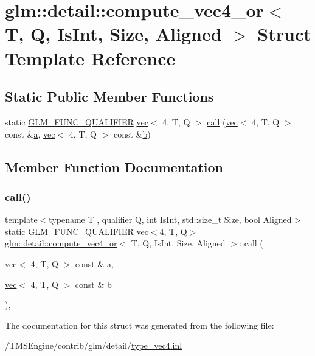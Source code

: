 \hypertarget{structglm_1_1detail_1_1compute__vec4__or}{}\section{glm\+:\+:detail\+:\+:compute\+\_\+vec4\+\_\+or$<$ T, Q, Is\+Int, Size, Aligned $>$ Struct Template Reference}
\label{structglm_1_1detail_1_1compute__vec4__or}
\subsection*{Static Public Member Functions}
\begin{DoxyCompactItemize}
\item 
static \hyperlink{setup_8hpp_a33fdea6f91c5f834105f7415e2a64407}{G\+L\+M\+\_\+\+F\+U\+N\+C\+\_\+\+Q\+U\+A\+L\+I\+F\+I\+ER} \hyperlink{structglm_1_1vec}{vec}$<$ 4, T, Q $>$ \hyperlink{structglm_1_1detail_1_1compute__vec4__or_a6d52ef76bd8362c6325edf1eb38a8d65}{call} (\hyperlink{structglm_1_1vec}{vec}$<$ 4, T, Q $>$ const \&\hyperlink{_s_d_l__opengl__glext_8h_a3309789fc188587d666cda5ece79cf82}{a}, \hyperlink{structglm_1_1vec}{vec}$<$ 4, T, Q $>$ const \&\hyperlink{_s_d_l__opengl__glext_8h_a0f71581a41fd2264c8944126dabbd010}{b})
\end{DoxyCompactItemize}


\subsection{Member Function Documentation}
\mbox{\label{structglm_1_1detail_1_1compute__vec4__or_a6d52ef76bd8362c6325edf1eb38a8d65}} 
\subsubsection{\texorpdfstring{call()}{call()}}
{\footnotesize\ttfamily template$<$typename T , qualifier Q, int Is\+Int, std\+::size\+\_\+t Size, bool Aligned$>$ \\
static \hyperlink{setup_8hpp_a33fdea6f91c5f834105f7415e2a64407}{G\+L\+M\+\_\+\+F\+U\+N\+C\+\_\+\+Q\+U\+A\+L\+I\+F\+I\+ER} \hyperlink{structglm_1_1vec}{vec}$<$4, T, Q$>$ \hyperlink{structglm_1_1detail_1_1compute__vec4__or}{glm\+::detail\+::compute\+\_\+vec4\+\_\+or}$<$ T, Q, Is\+Int, Size, Aligned $>$\+::call (\begin{DoxyParamCaption}\item[{\hyperlink{structglm_1_1vec}{vec}$<$ 4, T, Q $>$ const \&}]{a,  }\item[{\hyperlink{structglm_1_1vec}{vec}$<$ 4, T, Q $>$ const \&}]{b }\end{DoxyParamCaption})\hspace{0.3cm}{\ttfamily [inline]}, {\ttfamily [static]}}



The documentation for this struct was generated from the following file\+:\begin{DoxyCompactItemize}
\item 
/\+T\+M\+S\+Engine/contrib/glm/detail/\hyperlink{type__vec4_8inl}{type\+\_\+vec4.\+inl}\end{DoxyCompactItemize}
